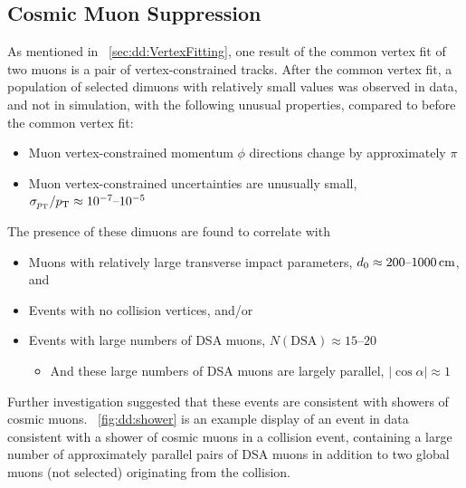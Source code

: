 \subsection{Cosmic Muon Suppression}
\label{sec:dd:CosmicCuts}
As mentioned in \Sec~\ref{sec:dd:VertexFitting}, one result of the common vertex fit of two muons is a pair of vertex-constrained tracks.
After the common vertex fit, a population of selected dimuons with relatively small \vchisq values was observed in data, and not in simulation, with the following unusual properties, compared to before the common vertex fit:
\begin{itemize}
  \item Muon vertex-constrained momentum $\phi$ directions change by approximately $\pi$
  \item Muon vertex-constrained \pT uncertainties are unusually small, \ie $\sigma_{p_{\mathrm{T}}}/p_{\mathrm{T}} \approx 10^{-7}\text{--}10^{-5}$
\end{itemize}
The presence of these dimuons are found to correlate with
\begin{itemize}
  \item Muons with relatively large transverse impact parameters, \ie $d_0 \approx 200\text{--}1000\,\text{cm}$, and
  \item Events with no \pp collision vertices, and/or
  \item Events with large numbers of DSA muons, \ie $N(\text{DSA}) \approx 15\text{--}20$
    \begin{itemize}
      \item And these large numbers of DSA muons are largely parallel, \ie $|\cos{\alpha}| \approx 1$
    \end{itemize}
\end{itemize}
Further investigation suggested that these events are consistent with showers of cosmic muons.
\Fig~\ref{fig:dd:shower} is an example display of an event in data consistent with a shower of cosmic muons in a \pp collision event, containing a large number of approximately parallel pairs of DSA muons in addition to two global muons (not selected) originating from the \pp collision.

